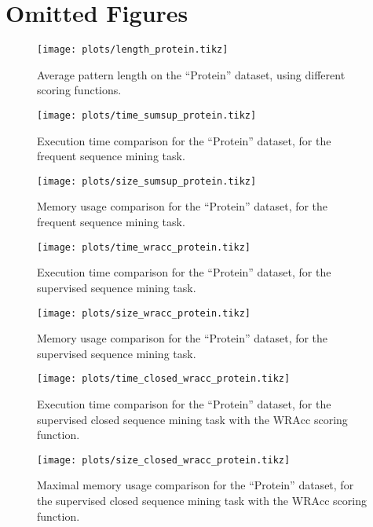 \documentclass{sigkddExp}
\newcommand{\wracc}{\mathrm{WRAcc}}
\begin{document}
\newpage
\printbibliography

\appendix

\section{Omitted Figures}
\begin{figure}[!hbtp]
	\centering
	\texttt{[image: plots/length\_protein.tikz]}
	\caption{Average pattern length on the ``Protein'' dataset, using different scoring functions.}
	\label{fig:length_protein}
\end{figure}%
\begin{figure}[!hbtp]
	\centering
	\texttt{[image: plots/time\_sumsup\_protein.tikz]}
	\caption{Execution time comparison for the ``Protein'' dataset, for the frequent sequence mining task.}
	\label{fig:time_sumsup_protein}
\end{figure}

\begin{figure}[!hbtp]
	\centering
	\texttt{[image: plots/size\_sumsup\_protein.tikz]}
	\caption{Memory usage comparison for the ``Protein'' dataset, for the frequent sequence mining task.}
	\label{fig:size_sumsup_protein}
\end{figure}

\begin{figure}[!hbtp]
	\centering
	\texttt{[image: plots/time\_wracc\_protein.tikz]}
	\caption{Execution time comparison for the ``Protein'' dataset, for the supervised sequence mining task.}
	\label{fig:time_wracc_protein}
\end{figure}

\begin{figure}[!hbtp]
	\centering
	\texttt{[image: plots/size\_wracc\_protein.tikz]}
	\caption{Memory usage comparison for the ``Protein'' dataset, for the supervised sequence mining task.}
	\label{fig:size_wracc_protein}
\end{figure}

\begin{figure}[!hbtp]
	\centering
	\texttt{[image: plots/time\_closed\_wracc\_protein.tikz]}
	\caption{Execution time comparison for the ``Protein'' dataset, for the supervised closed sequence mining task with the \(\wracc\) scoring function.}
	\label{fig:time_closed_wracc_protein}
\end{figure}

\begin{figure}[!hbtp]
	\centering
	\texttt{[image: plots/size\_closed\_wracc\_protein.tikz]}
	\caption{Maximal memory usage comparison for the ``Protein'' dataset, for the supervised closed sequence mining task with the \(\wracc\) scoring function.}
	\label{fig:size_closed_wracc_protein}
\end{figure}
\end{document}
